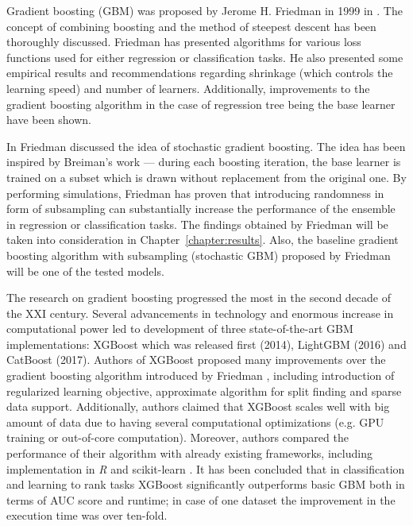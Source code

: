 \documentclass[magisterska, english]{pwr_wmat_praca_dyplomowa}
\theoremstyle{plain}
\numberwithin{theorem}{chapter}
\theoremstyle{definition}
\numberwithin{theorem}{chapter}
\begin{document}
Gradient boosting (GBM) was proposed by Jerome H. Friedman in 1999 in \cite{friedman_gbm}. The concept of combining boosting and the method of steepest descent has been thoroughly discussed. Friedman has presented algorithms for various loss functions used for either regression or classification tasks. He also presented some empirical results and recommendations regarding shrinkage (which controls the learning speed) and number of learners. Additionally, improvements to the gradient boosting algorithm in the case of regression tree being the base learner have been shown.

In \cite{friedman_stoch} Friedman discussed the idea of stochastic gradient boosting. The idea has been inspired by Breiman's work --- during each boosting iteration, the base learner is trained on a subset which is drawn without replacement from the original one. By performing simulations, Friedman has proven that introducing randomness in form of subsampling can substantially increase the performance of the ensemble in regression or classification tasks. The findings obtained by Friedman will be taken into consideration in Chapter~\ref{chapter:results}.
Also, the baseline gradient boosting algorithm with subsampling (stochastic GBM) proposed by Friedman will be one of the tested models.

The research on gradient boosting progressed the most in the second decade of the XXI century. Several advancements in technology and enormous increase in computational power led to development of three state-of-the-art GBM implementations: XGBoost \cite{xgboost} which was released first (2014), LightGBM \cite{lightgbm} (2016) and CatBoost \cite{catboost} (2017). Authors of XGBoost \cite{xgboost} proposed many improvements over the gradient boosting algorithm introduced by Friedman \cite{friedman_gbm}, including introduction of regularized learning objective, approximate algorithm for split finding and sparse data support. Additionally, authors claimed that XGBoost scales well with big amount of data due to having several computational optimizations (e.g. GPU training or out-of-core computation). Moreover, authors compared the performance of their algorithm with already existing frameworks, including implementation in \emph{R} and scikit-learn \cite{sklearn}. It has been concluded that in classification and learning to rank tasks XGBoost significantly outperforms basic GBM both in terms of AUC score and runtime; in case of one dataset the improvement in the execution time was over ten-fold.
\end{document}
